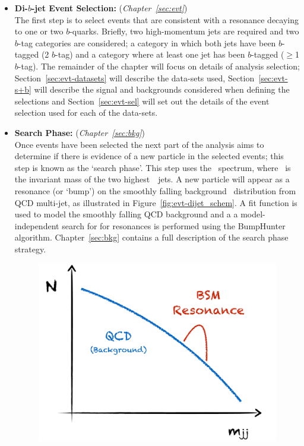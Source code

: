 \begin{itemize}[leftmargin=*]
\item\textbf{Di-$b$-jet Event Selection:} (\textit{Chapter~\ref{sec:evt}})\\
  The first step is to select events that are consistent with a resonance decaying to one or two $b$-quarks.
  Briefly, two high-momentum jets are required and two $b$-tag categories are considered;
  a category in which both jets have been $b$-tagged (2 $b$-tag) and a category where at least one jet has been $b$-tagged ($\geq$1 $b$-tag).
  The remainder of the chapter will focus on details of analysis selection;
  Section~\ref{sec:evt-datasets} will describe the data-sets used,
  Section~\ref{sec:evt-s+b} will describe the signal and backgrounds
  considered when defining the selections
  and Section~\ref{sec:evt-sel} will set out
  the details of the event selection used for each of the data-sets.
  \\
\item\textbf{Search Phase:} (\textit{Chapter~\ref{sec:bkg}})\\
  Once events have been selected the next part of the analysis aims to determine if there
  is evidence of a new particle in the selected events; this step is known as the `search phase'.
  This step uses the \mjj~spectrum, where \mjj~is the invariant mass of the two highest~\pT~jets.
  A new particle will appear as a resonance (or `bump') on the smoothly falling background
  \mjj~distribution from QCD multi-jet, as illustrated in Figure~\ref{fig:evt-dijet_schem}.
  A fit function is used to model the smoothly falling QCD background and a
  a model-independent search for for resonances is performed using the BumpHunter algorithm.
  Chapter~\ref{sec:bkg} contains a full description of the search phase strategy.
  \vspace{-2mm}
  \begin{figure}[!hbt]
  \begin{center}
    \includegraphics[width=0.65\linewidth, angle=0]{figs/Dibjet/Gen/dijet_schem.pdf}

\end{center}
\end{figure}
\end{itemize}
